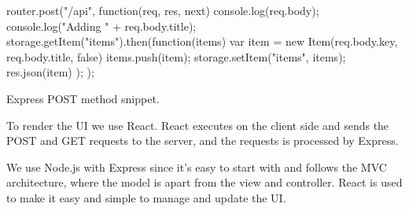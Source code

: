 \begin{listing}
    \begin{js}
        router.post("/api", function(req, res, next) {
            console.log(req.body);
            console.log("Adding " + req.body.title);
            storage.getItem("items").then(function(items) {
                var item = new Item(req.body.key, req.body.title, false)
                items.push(item);
                storage.setItem("items", items);
                res.json(item)
            });
        });
    \end{js}
    \caption{Express POST method snippet.}
    \label{lst:express_post}
\end{listing}

To render the UI we use React.
React executes on the client side and sends the POST and GET requests to the server, and the requests is processed by Express.

We use Node.js with Express since it's easy to start with and follows the MVC architecture, where the model is apart from the view and controller.
React is used to make it easy and simple to manage and update the UI. 